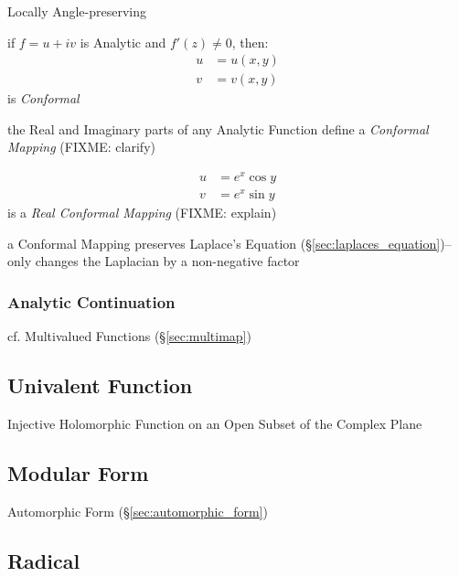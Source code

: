 Locally Angle-preserving

if $f = u + iv$ is Analytic and $f'(z) \neq 0$, then:
\begin{align*}
  u & = u(x,y) \\
  v & = v(x,y)
\end{align*}
is \emph{Conformal}

the Real and Imaginary parts of any Analytic Function define a \emph{Conformal
  Mapping} (FIXME: clarify)

\begin{align*}
  u & = e^x \cos y \\
  v & = e^x \sin y
\end{align*}
is a \emph{Real Conformal Mapping} (FIXME: explain)

a Conformal Mapping preserves Laplace's Equation
(\S\ref{sec:laplaces_equation})-- only changes the Laplacian by a non-negative
factor



\subsubsection{Analytic Continuation}\label{sec:analytic_continuation}

cf. Multivalued Functions (\S\ref{sec:multimap})



\subsection{Univalent Function}\label{sec:univalent_function}

Injective Holomorphic Function on an Open Subset of the Complex Plane



\subsection{Modular Form}\label{sec:modular_form}

Automorphic Form (\S\ref{sec:automorphic_form})



\subsection{Radical}\label{sec:radical}

